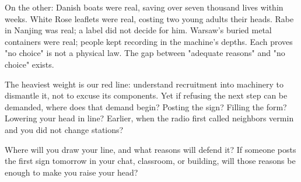 On the other: Danish boats were real, saving over seven thousand lives within weeks. White Rose leaflets were real, costing two young adults their heads. Rabe in Nanjing was real; a label did not decide for him. Warsaw's buried metal containers were real; people kept recording in the machine's depths. Each proves "no choice" is not a physical law. The gap between "adequate reasons" and "no choice" exists.

The heaviest weight is our red line: understand recruitment into machinery to dismantle it, not to excuse its components. Yet if refusing the next step can be demanded, where does that demand begin? Posting the sign? Filling the form? Lowering your head in line? Earlier, when the radio first called neighbors vermin and you did not change stations?

Where will you draw your line, and what reasons will defend it? If someone posts the first sign tomorrow in your chat, classroom, or building, will those reasons be enough to make you raise your head?
